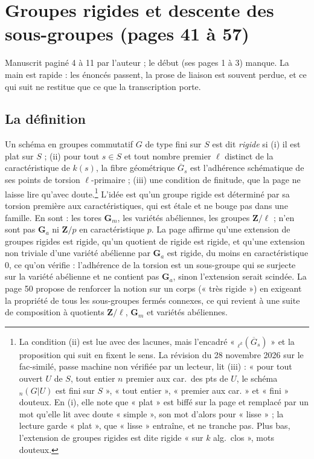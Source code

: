 \documentclass[11pt,a4paper]{article}
\begin{document}
\section*{Groupes rigides et descente des sous-groupes (pages 41 à 57)}

Manuscrit paginé 4 à 11 par l'auteur ; le début (ses pages 1 à 3) manque. La
main est rapide : les énoncés passent, la prose de liaison est souvent perdue,
et ce qui suit ne restitue que ce que la transcription porte.

\subsection*{La définition}

Un schéma en groupes commutatif $G$ de type fini sur $S$ est dit \emph{rigide}
si (i) il est plat sur $S$ ; (ii) pour tout $s \in S$ et tout nombre premier
$\ell$ distinct de la caractéristique de $k(s)$, la fibre géométrique
$\overline{G}_s$ est l'adhérence schématique de ses points de torsion
$\ell$-primaire ; (iii) une condition de finitude, que la page ne laisse lire
qu'avec doute.\footnote{La condition (ii) est lue avec des lacunes, mais l'encadré
« ${}_{\ell^k}(\overline{G}_s)$ » et la proposition qui suit en fixent le
sens. La révision du 28 novembre 2026 sur le fac-similé, passe machine non
vérifiée par un lecteur, lit (iii) : « pour tout ouvert $U$ de $S$, tout
entier $n$ premier aux car.\ des pts de $U$, le schéma ${}_{n}(G|U)$ est fini
sur $S$ », « tout entier », « premier aux car. » et « fini » douteux. En (i),
elle note que « plat » est biffé sur la page et remplacé par un mot qu'elle lit
avec doute « simple », son mot d'alors pour « lisse » ; la lecture garde
« plat », que « lisse » entraîne, et ne tranche pas. Plus bas, l'extension de
groupes rigides est dite rigide « sur $k$ alg.\ clos », mots douteux.} L'idée est qu'un groupe rigide est déterminé par sa torsion
première aux caractéristiques, qui est étale et ne bouge pas dans une famille.
En sont : les tores $\mathbf{G}_m$, les variétés abéliennes, les groupes
$\mathbf{Z}/\ell$ ; n'en sont pas $\mathbf{G}_a$ ni $\mathbf{Z}/p$ en
caractéristique $p$. La page affirme qu'une extension de groupes rigides est
rigide, qu'un quotient de rigide est rigide, et qu'une extension non triviale
d'une variété abélienne par $\mathbf{G}_a$ est rigide, du moins en
caractéristique $0$, ce qu'on vérifie : l'adhérence de la torsion est un
sous-groupe qui se surjecte sur la variété abélienne et ne contient pas
$\mathbf{G}_a$, sinon l'extension serait scindée. La page 50 propose de
renforcer la notion sur un corps (« très rigide ») en exigeant la propriété de
tous les sous-groupes fermés connexes, ce qui revient à une suite de
composition à quotients $\mathbf{Z}/\ell$, $\mathbf{G}_m$ et variétés
abéliennes.
\end{document}

